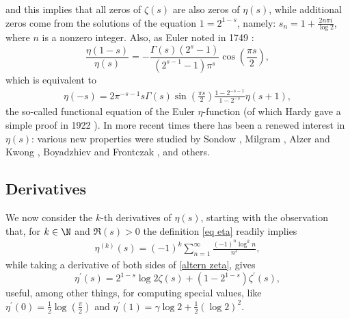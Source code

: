 \documentclass{amsart}
\theoremstyle{plain}
\theoremstyle{definition}
\begin{document}
and this implies that all zeros of $\zeta(s)$ are also zeros of $\eta(s)$, while additional zeros come from the solutions of the equation $1 = 2^{1-s}$, namely: $s_n=1+\frac{2n\pi i}{\log 2}$, where $n$ is a nonzero integer. 
Also, as Euler noted in 1749 \cite{Euler1749}: 
$$ 
\frac{\eta(1-s)}{\eta(s)} = - \frac{\Gamma(s)(2^s - 1)}{(2^{s-1} - 1) \pi^s} \cos \left( \frac{\pi s}{2} \right),
$$
which is equivalent to 
\begin{align}\label{eta functional}
    \eta(-s) = 2\pi^{-s-1}s\Gamma(s)\sin\left(\frac{\pi s}{2}\right)\frac{1-2^{-s-1}}{1-2^{-s}}\eta(s+1),
\end{align}
the so-called functional equation of the Euler \(\eta\)-function (of which Hardy  gave a simple proof in 1922 \cite{hardy}).
In more recent times there has been a renewed interest in $\eta(s)$: various new properties were studied by Sondow \cite{Son03}, Milgram
\cite{Mil13}, Alzer and Kwong \cite{AK15}, Boyadzhiev and Frontczak \cite{BF21}, and others.

\subsection*{Derivatives}
We now consider the $k$-th derivatives of $\eta(s)$, starting with the observation that, for $k\in \N$ and $\Re(s)>0$ the definition \eqref{eq eta} readily implies
\begin{align*}%
    \eta^{(k)}(s)=(-1)^k\sum_{n=1}^{\infty}\frac{(-1)^{n}\log^k n}{n^s},
\end{align*}
while taking a derivative of both sides of \eqref{altern zeta}, gives 
\begin{equation*}%
\eta^{\prime}(s) = 2^{1 -s} \log 2 \zeta(s) + (1 - 2^{1-s}) \zeta^{\prime}(s), 
\end{equation*}
useful, among other things, for computing special values, like $\eta^{\prime}(0) = \frac{1}{2} \log \left(\frac{\pi}{2} \right)$
and $\eta^{\prime}(1) = \gamma \log 2 + \frac{1}{2}(\log 2)^2$.
\end{document}
